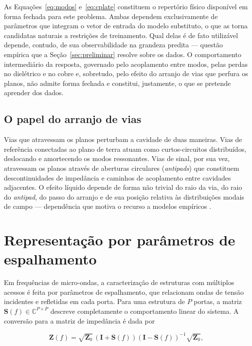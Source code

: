As Equações~\ref{eq:modos} e~\ref{eq:cplate} constituem o repertório físico
disponível em forma fechada para este problema. Ambas dependem exclusivamente de
parâmetros que integram o vetor de entrada do modelo substituto, o que as torna
candidatas naturais a restrições de treinamento. Qual delas é de fato utilizável
depende, contudo, de sua observabilidade na grandeza predita — questão empírica
que a Seção~\ref{sec:preliminar} resolve sobre os dados. O comportamento
intermediário da resposta, governado pelo acoplamento entre modos, pelas perdas
no dielétrico e no cobre e, sobretudo, pelo efeito do arranjo de vias que perfura
os planos, não admite forma fechada e constitui, justamente, o que se pretende
aprender dos dados.

\subsection{O papel do arranjo de vias}

Vias que atravessam os planos perturbam a cavidade de duas maneiras. Vias de
referência conectadas ao plano de terra atuam como curtos-circuitos distribuídos,
deslocando e amortecendo os modos ressonantes. Vias de sinal, por sua vez,
atravessam os planos através de aberturas circulares (\textit{antipads}) que
constituem descontinuidades de impedância e caminhos de acoplamento entre
cavidades adjacentes. O efeito líquido depende de forma não trivial do raio da
via, do raio do \textit{antipad}, do passo do arranjo e de sua posição relativa
às distribuições modais de campo — dependência que motiva o recurso a modelos
empíricos \citep{hillebrecht2024}.

\section{Representação por parâmetros de espalhamento}
\label{sec:sparam}

Em frequências de micro-ondas, a caracterização de estruturas com múltiplos
acessos é feita por parâmetros de espalhamento, que relacionam ondas de tensão
incidentes e refletidas em cada porta. Para uma estrutura de $P$ portas, a matriz
$\mathbf{S}(f) \in \mathbb{C}^{P \times P}$ descreve completamente o
comportamento linear do sistema. A conversão para a matriz de impedância é dada
por

\begin{equation}
\mathbf{Z}(f) = \sqrt{\mathbf{Z}_0}\,
                \left(\mathbf{I} + \mathbf{S}(f)\right)
                \left(\mathbf{I} - \mathbf{S}(f)\right)^{-1}
                \sqrt{\mathbf{Z}_0},
\label{eq:s2z}
\end{equation}

